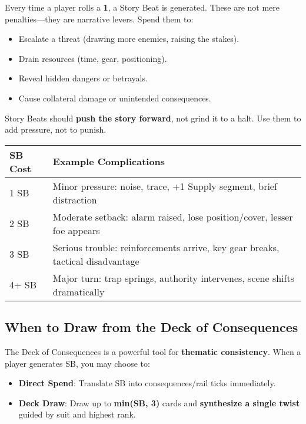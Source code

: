 Every time a player rolls a \textbf{1}, a Story Beat is generated. These are not mere penalties---they are narrative levers. Spend them to:

\begin{itemize}
    \item Escalate a threat (drawing more enemies, raising the stakes).
    \item Drain resources (time, gear, positioning).
    \item Reveal hidden dangers or betrayals.
    \item Cause collateral damage or unintended consequences.
\end{itemize}

Story Beats should \textbf{push the story forward}, not grind it to a halt. Use them to add pressure, not to punish.

\begin{fatebox}
\begin{tabularx}{\textwidth}{lX}
\toprule
\textbf{SB Cost} & \textbf{Example Complications} \\
\midrule
1 SB & Minor pressure: noise, trace, +1 Supply segment, brief distraction \\
2 SB & Moderate setback: alarm raised, lose position/cover, lesser foe appears \\
3 SB & Serious trouble: reinforcements arrive, key gear breaks, tactical disadvantage \\
4+ SB & Major turn: trap springs, authority intervenes, scene shifts dramatically \\
\bottomrule
\end{tabularx}
\end{fatebox}

\subsection{When to Draw from the Deck of Consequences}

The Deck of Consequences is a powerful tool for \textbf{thematic consistency}. When a player generates SB, you may choose to:

\begin{itemize}
    \item \textbf{Direct Spend}: Translate SB into consequences/rail ticks immediately.
    \item \textbf{Deck Draw}: Draw up to \textbf{min(SB, 3)} cards and \textbf{synthesize a single twist} guided by suit and highest rank.
\end{itemize}

